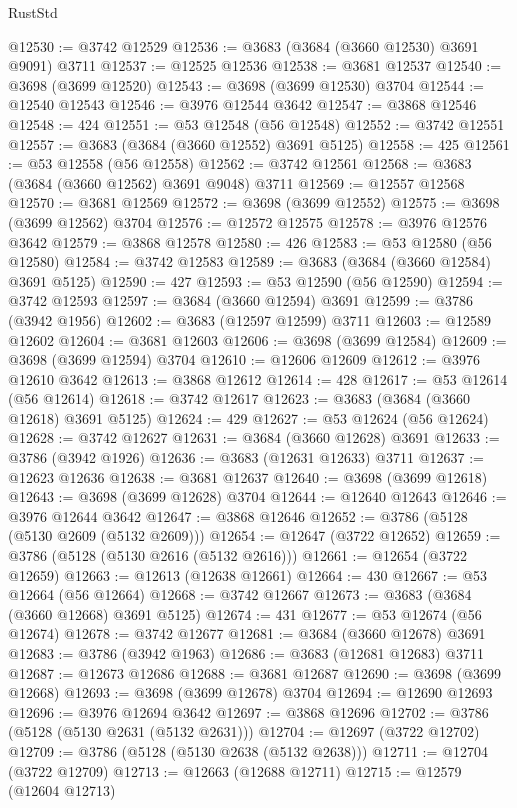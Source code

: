 \begin{lexlean}{RustStd}
\begin{coremodule}
{\begin{coremodule}
{{{{{{{{{{{{{{{{{{{{{{{{{{{{{{{{{{{{{{{{{{{{{{{@12530 := @3742 @12529
@12536 := @3683 (@3684 (@3660 @12530) @3691 @9091) @3711
@12537 := @12525 @12536
@12538 := @3681 @12537
@12540 := @3698 (@3699 @12520)
@12543 := @3698 (@3699 @12530) @3704
@12544 := @12540 @12543
@12546 := @3976 @12544 @3642
@12547 := @3868 @12546
@12548 := 424
@12551 := @53 @12548 (@56 @12548)
@12552 := @3742 @12551
@12557 := @3683 (@3684 (@3660 @12552) @3691 @5125)
@12558 := 425
@12561 := @53 @12558 (@56 @12558)
@12562 := @3742 @12561
@12568 := @3683 (@3684 (@3660 @12562) @3691 @9048) @3711
@12569 := @12557 @12568
@12570 := @3681 @12569
@12572 := @3698 (@3699 @12552)
@12575 := @3698 (@3699 @12562) @3704
@12576 := @12572 @12575
@12578 := @3976 @12576 @3642
@12579 := @3868 @12578
@12580 := 426
@12583 := @53 @12580 (@56 @12580)
@12584 := @3742 @12583
@12589 := @3683 (@3684 (@3660 @12584) @3691 @5125)
@12590 := 427
@12593 := @53 @12590 (@56 @12590)
@12594 := @3742 @12593
@12597 := @3684 (@3660 @12594) @3691
@12599 := @3786 (@3942 @1956)
@12602 := @3683 (@12597 @12599) @3711
@12603 := @12589 @12602
@12604 := @3681 @12603
@12606 := @3698 (@3699 @12584)
@12609 := @3698 (@3699 @12594) @3704
@12610 := @12606 @12609
@12612 := @3976 @12610 @3642
@12613 := @3868 @12612
@12614 := 428
@12617 := @53 @12614 (@56 @12614)
@12618 := @3742 @12617
@12623 := @3683 (@3684 (@3660 @12618) @3691 @5125)
@12624 := 429
@12627 := @53 @12624 (@56 @12624)
@12628 := @3742 @12627
@12631 := @3684 (@3660 @12628) @3691
@12633 := @3786 (@3942 @1926)
@12636 := @3683 (@12631 @12633) @3711
@12637 := @12623 @12636
@12638 := @3681 @12637
@12640 := @3698 (@3699 @12618)
@12643 := @3698 (@3699 @12628) @3704
@12644 := @12640 @12643
@12646 := @3976 @12644 @3642
@12647 := @3868 @12646
@12652 := @3786 (@5128 (@5130 @2609 (@5132 @2609)))
@12654 := @12647 (@3722 @12652)
@12659 := @3786 (@5128 (@5130 @2616 (@5132 @2616)))
@12661 := @12654 (@3722 @12659)
@12663 := @12613 (@12638 @12661)
@12664 := 430
@12667 := @53 @12664 (@56 @12664)
@12668 := @3742 @12667
@12673 := @3683 (@3684 (@3660 @12668) @3691 @5125)
@12674 := 431
@12677 := @53 @12674 (@56 @12674)
@12678 := @3742 @12677
@12681 := @3684 (@3660 @12678) @3691
@12683 := @3786 (@3942 @1963)
@12686 := @3683 (@12681 @12683) @3711
@12687 := @12673 @12686
@12688 := @3681 @12687
@12690 := @3698 (@3699 @12668)
@12693 := @3698 (@3699 @12678) @3704
@12694 := @12690 @12693
@12696 := @3976 @12694 @3642
@12697 := @3868 @12696
@12702 := @3786 (@5128 (@5130 @2631 (@5132 @2631)))
@12704 := @12697 (@3722 @12702)
@12709 := @3786 (@5128 (@5130 @2638 (@5132 @2638)))
@12711 := @12704 (@3722 @12709)
@12713 := @12663 (@12688 @12711)
@12715 := @12579 (@12604 @12713)
}}}}}}}}}}}}}}}}}}}}}}}}}}}}}}}}}}}}}}}}}}}}}}}
\end{coremodule}}
\end{coremodule}
\end{lexlean}
